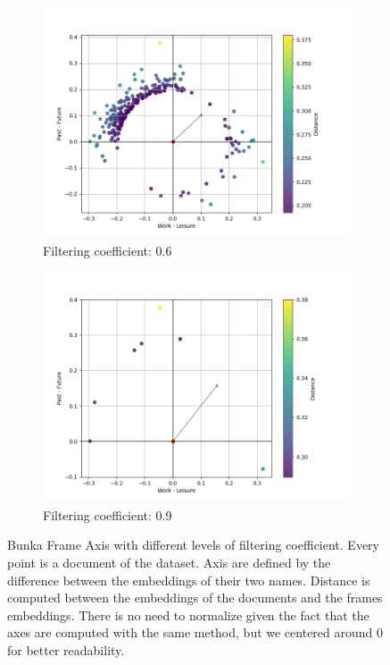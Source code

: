 \documentclass{article}
\begin{document}
\begin{figure}
 \medskip
 \begin{subfigure}{0.49\textwidth}
     \centering
      \includegraphics[width=\linewidth]{img/radius_optimization/0.6.png}
     \caption{Filtering coefficient: 0.6}
     \label{fig:c}
 \end{subfigure}
 \hfill
 \begin{subfigure}{0.49\textwidth}
     \centering
       \includegraphics[width=\linewidth]{img/radius_optimization/0.9.png}
     \caption{Filtering coefficient: 0.9}
     \label{fig:d}
 \end{subfigure}
 \caption{Bunka Frame Axis with different levels of filtering coefficient. Every point is a document of the dataset. Axis are defined by the difference between the embeddings of their two names. Distance is computed between the embeddings of the documents and the frames embeddings. There is no need to normalize given the fact that the axes are computed with the same method, but we centered around 0 for  better readability.
} %
\end{figure}
\end{document}
